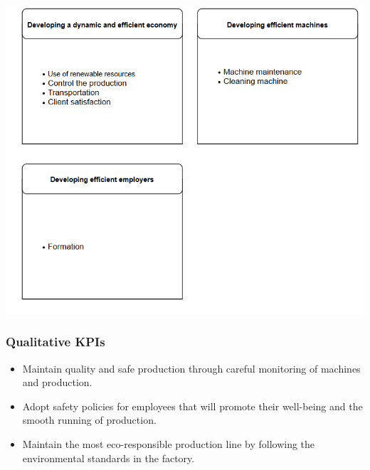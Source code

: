 \includegraphics{Img/tableaudebord.png}

\subsubsection{Qualitative KPIs}
\begin{itemize}
    \item Maintain quality and safe production through careful monitoring of machines and production.
    \item Adopt safety policies for employees that will promote their well-being and the smooth running of production.
    \item Maintain the most eco-responsible production line by following the environmental standards in the factory.
\end{itemize}

